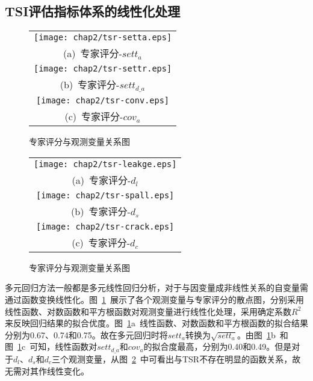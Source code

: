 \subsection{TSI评估指标体系的线性化处理}

\begin{figure}[htbp!] 
    \centering 
    \begin{tabular}{c} 
        \texttt{[image: chap2/tsr-setta.eps]} \\ 
        (a)~专家评分-${sett}_{a}$ \\
        \texttt{[image: chap2/tsr-settr.eps]} \\ 
        (b)~专家评分-$set{{t}_{d\_a}}$ \\
        \texttt{[image: chap2/tsr-conv.eps]} \\ 
        (c)~专家评分-${cov}_{a}$ \\
    \end{tabular}
    \caption{专家评分与观测变量关系图} 
    \label{fig:TSR与观测变量关系图} 
\end{figure}

\begin{figure}[htbp!] 
    \centering 
    \begin{tabular}{c} 
        \texttt{[image: chap2/tsr-leakge.eps]} \\ 
        (a)~专家评分-${d}_{l}$ \\
        \texttt{[image: chap2/tsr-spall.eps]} \\ 
        (b)~专家评分-$d_s$ \\
        \texttt{[image: chap2/tsr-crack.eps]} \\ 
        (c)~专家评分-$d_c$ \\
    \end{tabular}
    \caption{专家评分与观测变量关系图} 
    \label{fig:TSR与观测变量关系图2} 
\end{figure}

多元回归方法一般都是多元线性回归分析，对于与因变量成非线性关系的自变量需通过函数变换线性化。图~\ref{fig:TSR与观测变量关系图}~展示了各个观测变量与专家评分的散点图，分别采用线性函数、对数函数和平方根函数对观测变量进行线性化处理，采用确定系数$R^2$来反映回归结果的拟合优度。图~\ref{fig:TSR与观测变量关系图}a~线性函数、对数函数和平方根函数的拟合结果分别为0.67、0.74和0.75。故在多元回归时将${sett}_{a}$转换为$\sqrt{sett_a}$。由图~\ref{fig:TSR与观测变量关系图}b~和图~\ref{fig:TSR与观测变量关系图}c~可知，线性函数对$set{{t}_{d\_a}}$和${cov}_{a}$的拟合度最高，分别为0.40和0.49。但是对于${d}_{l}$、$d_s$和$d_c$三个观测变量，从图~\ref{fig:TSR与观测变量关系图2}~中可看出与TSR不存在明显的函数关系，故无需对其作线性变化。

